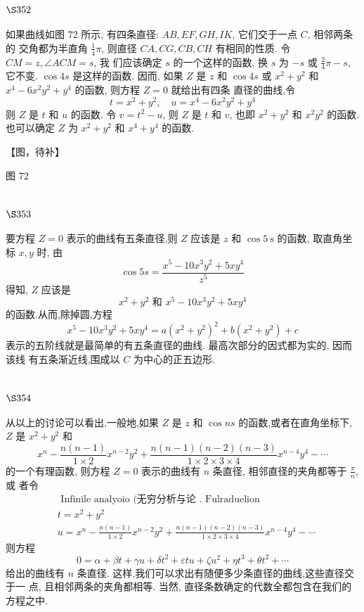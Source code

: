 \section{$\S 352$}

如果曲线如图 72 所示, 有四条直径: $A B, E F, G H, I K$, 它们交于一点 $C$, 相邻两条的 交角都为半直角 $\frac{1}{4} \pi$, 则直径 $C A, C G, C B, C H$ 有相同的性质. 令 $C M=z, \angle A C M=s$, 我 们应该确定 $s$ 的一个这样的函数, 换 $s$ 为 $-s$ 或 $\frac{2}{4} \pi-s$, 它不变. $\cos 4 s$ 是这样的函数. 因而, 如果 $Z$ 是 $z$ 和 $\cos 4 s$ 或 $x^{2}+y^{2}$ 和 $x^{4}-6 x^{2} y^{2}+y^{4}$ 的函数, 则方程 $Z=0$ 就给出有四条 直径的曲线,令
\[
t=x^{2}+y^{2}, \quad u=x^{4}-6 x^{2} y^{2}+y^{4}
\]
则 $Z$ 是 $t$ 和 $u$ 的函数. 令 $v=t^{2}-u$, 则 $Z$ 是 $t$ 和 $v$, 也即 $x^{2}+y^{2}$ 和 $x^{2} y^{2}$ 的函数. 也可以确定 $Z$ 为 $x^{2}+y^{2}$ 和 $x^{4}+y^{4}$ 的函数.


【图，待补】

图 72

\section{$\S 353$}

要方程 $Z=0$ 表示的曲线有五条直径,则 $Z$ 应该是 $z$ 和 $\cos 5 \mathrm{~s}$ 的函数, 取直角坐标 $x, y$ 时, 由
\[
\cos 5 s=\frac{x^{5}-10 x^{3} y^{2}+5 x y^{4}}{z^{5}}
\]
得知, $Z$ 应该是
\[
x^{2}+y^{2} \text { 和 } x^{5}-10 x^{3} y^{2}+5 x y^{4}
\]
的函数.从而,除掉圆,方程
\[
x^{5}-10 x^{3} y^{2}+5 x y^{4}=a\left(x^{2}+y^{2}\right)^{2}+b\left(x^{2}+y^{2}\right)+c
\]
表示的五阶线就是最简单的有五条直径的曲线. 最高次部分的因式都为实的, 因而该线 有五条渐近线,围成以 $C$ 为中心的正五边形.

\section{$\S 354$}

从以上的讨论可以看出,一般地,如果 $Z$ 是 $z$ 和 $\cos n s$ 的函数,或者在直角坐标下, $Z$ 是 $x^{2}+y^{2}$ 和
\[
x^{n}-\frac{n(n-1)}{1 \times 2} x^{n-2} y^{2}+\frac{n(n-1)(n-2)(n-3)}{1 \times 2 \times 3 \times 4} x^{n-4} y^{4}-\cdots
\]
的一个有理函数, 则方程 $Z=0$ 表示的曲线有 $n$ 条直径, 相邻直径的夹角都等于 $\frac{\pi}{n}$, 或 者令 
\[
\begin{aligned}
& \text { Infinile analyoio (无穷分析与论 . Fulraduelion } \\
& t=x^{2}+y^{2} \\
& u=x^{n}-\frac{n(n-1)}{1 \times 2} x^{n-2} y^{2}+\frac{n(n-1)(n-2)(n-3)}{1 \times 2 \times 3 \times 4} x^{n-4} y^{4}-\cdots
\end{aligned}
\]
则方程
\[
0=\alpha+\beta t+\gamma u+\delta t^{2}+\varepsilon t u+\zeta u^{2}+\eta t^{3}+\theta t^{2}+\cdots
\]
给出的曲线有 $n$ 条直径. 这样,我们可以求出有随便多少条直径的曲线,这些直径交于一 点, 且相邻两条的夹角都相等. 当然, 直径条数确定的代数全都包含在我们的方程之中.

